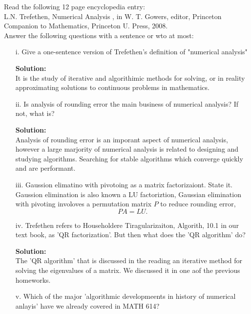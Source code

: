 \documentclass[12pt]{article}
\makeatletter
\theoremstyle{homework}
\newenvironment{exercise}[1]
{\def\@currentlabel{#1}\exercisecore}
{\endexercisecore}
\newcommand{\localhead}[1]{\par\smallskip\noindent\textbf{#1}\nobreak\\}%
\newcommand\solution{\localhead{Solution:}}
\makeatother
\begin{document}
\vspace{1in}













\begin{exercise}{P20} Read the following 12 page encyclopedia entry: \\
L.N. Trefethen, Numerical Analysis , in W. T. Gowers, editor, Princeton\\
Companion to Mathematics, Princeton U. Press, 2008.\\
Answer the following questions with a sentence or wto at most: 
\begin{enumerate}
  \item[i.] Give a one-sentence version of Trefethen's definition of "numerical analysis"\\
  \solution It is the study of iterative and algorithimic methods for solving, or in reality approximating solutions to continuous problems in mathematics. 
  \item[ii.] Is analysis of rounding error the main business of numerical analysis? If not, what is?\\
  \solution Analysis of rounding error is an imporant aspect of numerical analysis, however a large marjority of numerical analysis 
  is related to designing and studying algorithms. Searching for stable algorithms which converge quickly and are performant. 
  \item[iii.] Gaussion elimatino with pivotoing as a matrix factorizaiont. State it. \\
  Gaussion elimination is also known a LU factoriztion, Gaussian elimination with pivoting involoves 
  a permutation matrix $P$ to reduce rounding error, 
  \begin{equation*}
    PA = LU.
  \end{equation*} 
  \item[iv.] Trefethen refers to Householdere Tiragularizaiton, Algorith, 10.1 in our text book, as 
  'QR factorization'. But then what does the 'QR algorithm' do?\\ 
  \solution The 'QR algorithm' that is discussed in the reading an iterative method for solving the eigenvalues of a matrix. We discussed 
  it in one aof the previous homeworks. 
  \item[v.]Which of the major 'algorithmic developmeents in history of numerical anlayis' have we already covered in MATH 614? \

\end{enumerate}
\end{exercise}
\end{document}
